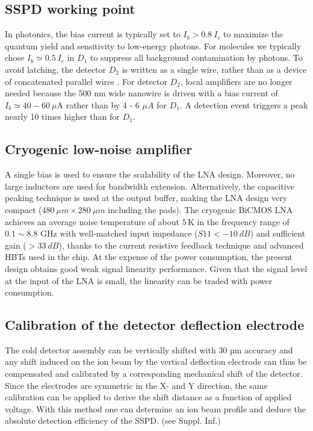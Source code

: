 \documentclass[12pt]{article}
\begin{document}
\subsection*{SSPD working point}
In photonics, the bias current is typically set to $I_b > 0.8 ~I_c$ to maximize the quantum yield and sensitivity to low-energy photons. For molecules we typically chose $I_b \simeq 0.5~ I_c$ in $D_1$ to suppress all background contamination by photons. To avoid latching, the detector $D_2$ is written as a single wire, rather than as a device of concatenated parallel wires \cite{Cristiano2015,Ejrnaes2009,Cristiano2012}. For detector $D_2$, local amplifiers are no longer needed because the 500 nm wide nanowire is driven with a bias current of $I_b \simeq 40 - 60 ~\mu$A rather than by 4 - 6 $\mu A$ for $D_1$. A detection event triggers a peak nearly 10 times higher than for $D_1$.  

\subsection*{Cryogenic low-noise amplifier}
A single bias is used to ensure the scalability of the LNA design. Moreover, no large inductors are used for bandwidth extension. Alternatively, the capacitive peaking technique is used at the output buffer, making the LNA design very compact ($480~ \mu m \times 280~ \mu m$ including the pads).
The cryogenic BiCMOS LNA achieves an average noise temperature of about $5\,$K in the frequency range of $0.1 \sim 8.8$ GHz with well-matched input impedance ($S11 < -10 ~dB$) and sufficient gain ($> 33 ~dB$), thanks to the current resistive feedback technique and advanced HBTs used in the chip. At the expense of the power consumption, the present design obtains good weak signal linearity performance. Given that the signal level at the input of the LNA is small, the linearity can be traded with power consumption.

\subsection*{Calibration of the detector deflection electrode}	
The cold detector assembly can be vertically shifted with 30 µm accuracy and any shift induced on the ion beam by the vertical deflection electrode can thus be compensated and calibrated by a corresponding mechanical shift of the detector. Since the electrodes are symmetric in the X- and Y direction, the same calibration can be applied to derive the shift distance as a function of applied voltage. With this method one can determine an ion beam profile and deduce the absolute detection efficiency of the SSPD. (see Suppl. Inf.)
\end{document}
